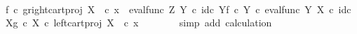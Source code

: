 \begin{isabellebody}
\ \ \ \ \isamarkupfalse%
\ \isamarkupfalse%
\ {\isachardoublequoteopen}{\isacharparenleft}{\kern0pt}f\isactrlsup {\isasymflat}\ {\isasymcirc}\isactrlsub c\ {\isasymlangle}g\isactrlsup {\isasymflat}{\isacharcomma}{\kern0pt}right{\isacharunderscore}{\kern0pt}cart{\isacharunderscore}{\kern0pt}proj\ X\ {\isasymone}{\isasymrangle}{\isacharparenright}{\kern0pt}\ {\isasymcirc}\isactrlsub c\ x{}\ {\isacharequal}{\kern0pt}\ {\isacharparenleft}{\kern0pt}{\isacharparenleft}{\kern0pt}{\isacharparenleft}{\kern0pt}eval{\isacharunderscore}{\kern0pt}func\ Z\ Y\ {\isasymcirc}\isactrlsub c\ {\isasymlangle}id\isactrlsub c\ Y{\isacharcomma}{\kern0pt}f\ {\isasymcirc}\isactrlsub c\ {\isasymbeta}\isactrlbsub Y\isactrlesub {\isasymrangle}{\isacharparenright}{\kern0pt}\ {\isasymcirc}\isactrlsub c\ eval{\isacharunderscore}{\kern0pt}func\ Y\ X\ {\isasymcirc}\isactrlsub c\ {\isasymlangle}id\isactrlsub c\ X{\isacharcomma}{\kern0pt}g\ {\isasymcirc}\isactrlsub c\ {\isasymbeta}\isactrlbsub X\isactrlesub {\isasymrangle}{\isacharparenright}{\kern0pt}\ {\isasymcirc}\isactrlsub c\ left{\isacharunderscore}{\kern0pt}cart{\isacharunderscore}{\kern0pt}proj\ X\ {\isasymone}{\isacharparenright}{\kern0pt}\ {\isasymcirc}\isactrlsub c\ x{}{\isachardoublequoteclose}\isanewline
\ \ \ \ \ \ \isamarkupfalse%
\ {\isacharparenleft}{\kern0pt}simp\ add{\isacharcolon}{\kern0pt}\ calculation{\isacharparenright}{\kern0pt}\isanewline
\ \ \isamarkupfalse%
\isanewline
\ \ \isamarkupfalse%
\ \isamarkupfalse%

\end{isabellebody}
